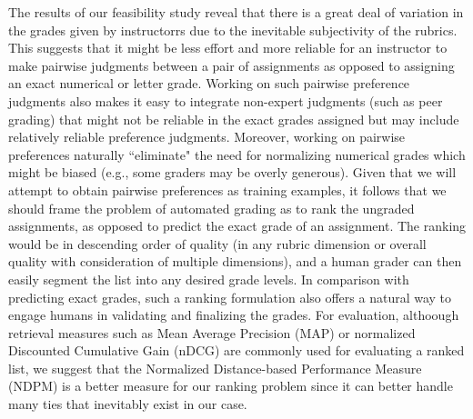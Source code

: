 The results of our feasibility study reveal that there is a great deal of 
variation in the grades given by instructorrs due to the inevitable subjectivity of the rubrics. 
This suggests that  it might be less effort and more reliable for an instructor to make pairwise judgments between
a pair of assignments  as opposed to assigning an exact numerical or letter grade. Working 
on such pairwise preference judgments also makes it easy to integrate
 non-expert judgments (such as peer grading) that might not be reliable in the exact grades assigned but may include relatively reliable preference judgments. Moreover, working on pairwise preferences naturally ``eliminate" the need for normalizing numerical grades which might be biased 
(e.g., some graders may be overly generous).  
Given that we will attempt to obtain pairwise preferences as training examples, it follows that we should frame the problem of automated grading as to rank the ungraded assignments, as opposed to predict the exact grade of an assignment. The ranking would be in descending order of quality (in any rubric dimension or overall quality with consideration of multiple dimensions), and a human grader can  then easily segment the list into any desired grade levels.  In comparison with predicting exact grades, such a ranking formulation also offers a natural way to engage humans in validating and finalizing the grades. 
For evaluation, althoough retrieval measures such as Mean Average Precision (MAP) or normalized Discounted Cumulative Gain (nDCG) are commonly used for evaluating a ranked list, we suggest that the Normalized Distance-based Performance Measure (NDPM) is a better measure for our ranking problem since it can better handle many ties that inevitably exist in our case. 

